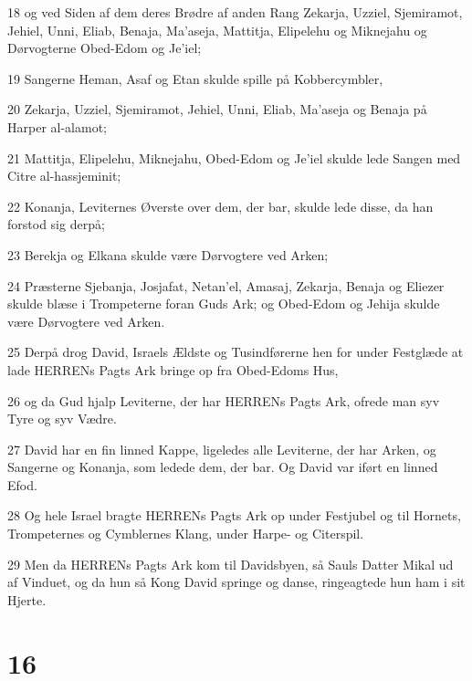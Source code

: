 \par 18 og ved Siden af dem deres Brødre af anden Rang Zekarja, Uzziel, Sjemiramot, Jehiel, Unni, Eliab, Benaja, Ma'aseja, Mattitja, Elipelehu og Miknejahu og Dørvogterne Obed-Edom og Je'iel;
\par 19 Sangerne Heman, Asaf og Etan skulde spille på Kobbercymbler,
\par 20 Zekarja, Uzziel, Sjemiramot, Jehiel, Unni, Eliab, Ma'aseja og Benaja på Harper al-alamot;
\par 21 Mattitja, Elipelehu, Miknejahu, Obed-Edom og Je'iel skulde lede Sangen med Citre al-hassjeminit;
\par 22 Konanja, Leviternes Øverste over dem, der bar, skulde lede disse, da han forstod sig derpå;
\par 23 Berekja og Elkana skulde være Dørvogtere ved Arken;
\par 24 Præsterne Sjebanja, Josjafat, Netan'el, Amasaj, Zekarja, Benaja og Eliezer skulde blæse i Trompeterne foran Guds Ark; og Obed-Edom og Jehija skulde være Dørvogtere ved Arken.
\par 25 Derpå drog David, Israels Ældste og Tusindførerne hen for under Festglæde at lade HERRENs Pagts Ark bringe op fra Obed-Edoms Hus,
\par 26 og da Gud hjalp Leviterne, der har HERRENs Pagts Ark, ofrede man syv Tyre og syv Vædre.
\par 27 David har en fin linned Kappe, ligeledes alle Leviterne, der har Arken, og Sangerne og Konanja, som ledede dem, der bar. Og David var iført en linned Efod.
\par 28 Og hele Israel bragte HERRENs Pagts Ark op under Festjubel og til Hornets, Trompeternes og Cymblernes Klang, under Harpe- og Citerspil.
\par 29 Men da HERRENs Pagts Ark kom til Davidsbyen, så Sauls Datter Mikal ud af Vinduet, og da hun så Kong David springe og danse, ringeagtede hun ham i sit Hjerte.

\chapter{16}

